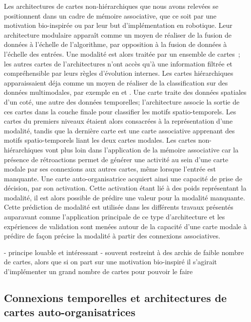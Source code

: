 \documentclass[../main]{subfiles}
\begin{document}
Les architectures de cartes non-hiérarchiques que nous avons relevées se positionnent dans un cadre de mémoire associative, que ce soit par une motivation bio-inspirée ou par leur but d'implémentation en robotique.
Leur architecture modulaire apparaît comme un moyen de réaliser de la fusion de données à l'échelle de l'algorithme, par opposition à la fusion de données à l'échelle des entrées. Une modalité est alors traitée par un ensemble de cartes~; les autres cartes de l'architectures n'ont accès qu'à une information filtrée et compréhensible par leurs règles d'évolution internes. 
Les cartes hiérarchiques apparaissaient déja comme un moyen de réaliser de la classification sur des données multimodales, par exemple en \cite{mici_self-organizing_2018} et \cite{nawaratne_hierarchical_2020-1}. 
Une carte traite des données spatiales d'un coté, une autre des données temporelles; l'architecture associe la sortie de ces cartes dans la couche finale pour classifier les motifs spatio-temporels. Les cartes du premiers niveaux étaient alors consacrées à la représentation d'une modalité, tandis que la dernière carte est une carte associative apprenant des motifs spatio-temporels liant les deux cartes modales.
Les cartes non-hiérarchiques vont plus loin dans l'application de la mémoire associative car la présence de rétroactions permet de générer une activité au sein d'une carte
modale par ses connexions aux autres cartes, même lorsque l'entrée est manquante. Une carte auto-organisatrice acquiert ainsi une capacité de prise de décision, par son activation.
Cette activation étant lié à des poids représentant la modalité, il est alors possible de prédire une valeur pour la modalité manquante. 
Cette prédiction de modalité est utilisée dans les différents travaux présentés auparavant comme l'application principale de ce type d'architecture et les expériences de validation sont menées autour de la capacité d'une carte modale à prédire de façon précise la modalité à partir des connexions associatives.

- principe louable et intéressant
- souvent restreint à des archis de faible nombre de cartes, alors que si on part sur une motivation bio-inspiré il s'agirait d'implémenter un grand nombre de cartes pour pouvoir le faire


\subsection{Connexions temporelles et architectures de cartes auto-organisatrices}
\end{document}
